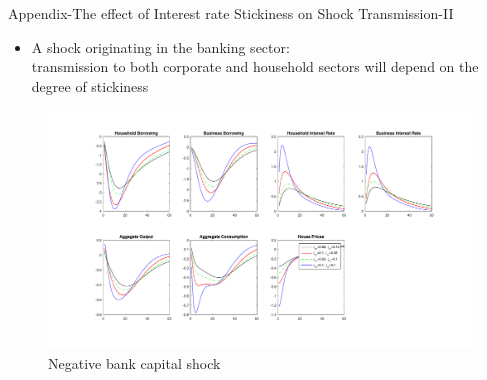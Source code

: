 \documentclass[8pt,aspectratio=169]{beamer}
\numberwithin{equation}{section}
\begin{document}
\begin{frame}{Appendix-The effect of Interest rate Stickiness on Shock Transmission-II}

\begin{itemize}
\item A shock originating in the banking sector: \\transmission to both corporate and household sectors will depend on the degree of stickiness
\end{itemize}    

\begin{figure}[H]
\centering
\caption{Negative bank capital shock}
\includegraphics[scale=0.3]{stickinessCAB.pdf}
\end{figure}



\end{frame}
\end{document}
